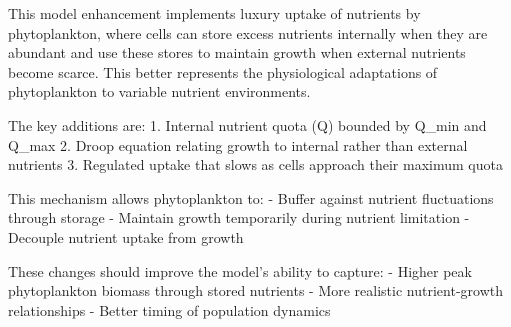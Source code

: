 This model enhancement implements luxury uptake of nutrients by phytoplankton, where cells can store excess nutrients internally when they are abundant and use these stores to maintain growth when external nutrients become scarce. This better represents the physiological adaptations of phytoplankton to variable nutrient environments.

The key additions are:
1. Internal nutrient quota (Q) bounded by Q_min and Q_max
2. Droop equation relating growth to internal rather than external nutrients
3. Regulated uptake that slows as cells approach their maximum quota

This mechanism allows phytoplankton to:
- Buffer against nutrient fluctuations through storage
- Maintain growth temporarily during nutrient limitation
- Decouple nutrient uptake from growth

These changes should improve the model's ability to capture:
- Higher peak phytoplankton biomass through stored nutrients
- More realistic nutrient-growth relationships
- Better timing of population dynamics

